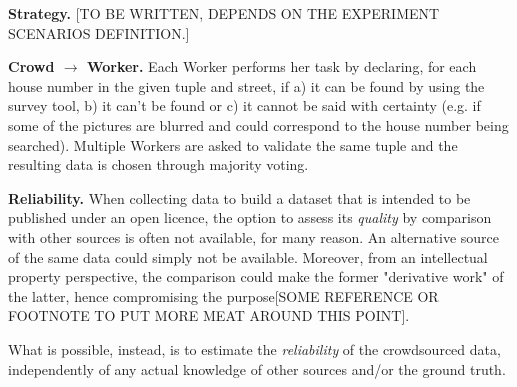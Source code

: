     \textbf{Strategy.} 
    {[}TO BE WRITTEN, DEPENDS ON THE EXPERIMENT SCENARIOS DEFINITION.{]}
    
    \textbf{Crowd $\rightarrow$ Worker.} Each Worker performs her task by declaring, for each house number in the given tuple and street, if a) it can be found by using the survey tool, b) it can't be found or c) it cannot be said with certainty (e.g. if some of the pictures are blurred and could correspond to the house number being searched). Multiple Workers are asked to validate the same tuple and the resulting data is chosen through majority voting.
    
    \textbf{Reliability.} When collecting data to build a dataset that is intended to be published under an open licence, the option to assess its \textit{quality} by comparison with other sources is often not available, for many reason. An alternative source of the same data could simply not be available. Moreover, from an intellectual property perspective, the comparison could make the former "derivative work" of the latter, hence compromising the purpose{[}SOME REFERENCE OR FOOTNOTE TO PUT MORE MEAT AROUND THIS POINT{]}. 
    
    What is possible, instead, is to estimate the \textit{reliability} of the crowdsourced data, independently of any actual knowledge of other sources and/or the ground truth. 
    
